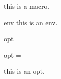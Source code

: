 \documentclass{l3doc}
\begin{document}
\lipsum


\begin{function}{\macro}
this is a macro.
\end{function}

\begin{environment}{env}
this is an env.
\end{environment}

\begin{function}{opt}
\begin{syntax}
    opt = 
\end{syntax}
this is an opt.
\end{function}

\PrintIndex
\end{document}
